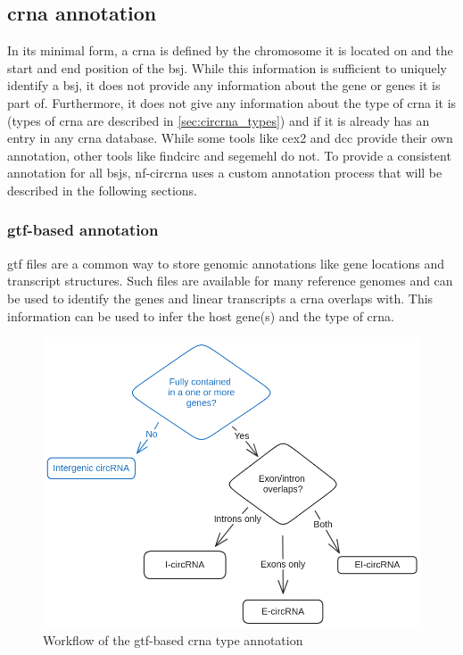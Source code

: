 \subsection{\gls{crna} annotation}
In its minimal form, a \gls{crna} is defined by the chromosome it is located on
and the start and end position of the \gls{bsj}.
While this information is sufficient to uniquely identify a \gls{bsj}, it does
not provide any information about the gene or genes it is part of.
Furthermore, it does not give any information about the type of \gls{crna} it
is (types of \gls{crna} are described in \cref{sec:circrna_types}) and if it is
already has an entry in any \gls{crna} database.
While some tools like \gls{cex2} and \gls{dcc} provide their own annotation, other
tools like \gls{findcirc} and \gls{segemehl} do not.
To provide a consistent annotation for all \glspl{bsj}, \gls{nf-circrna} uses a
custom annotation process that will be described in the following sections.

\subsubsection{\gls{gtf}-based annotation}
\label{sec:gtf_annotation}
\gls{gtf} files are a common way to store genomic annotations like gene
locations and
transcript structures.
Such files are available for many reference genomes and can be used to identify
the genes and linear transcripts a \gls{crna} overlaps with.
This information can be used to infer the host gene(s) and the type of
\gls{crna}.

\begin{figure}[ht]
    \centering

    \includegraphics[width=\textwidth]{chapters/3_materials_and_methods/figures/annotation.png}
    \caption{Workflow of the \gls{gtf}-based \gls{crna} type annotation}
    \label{fig:gtf_annotation}
\end{figure}

